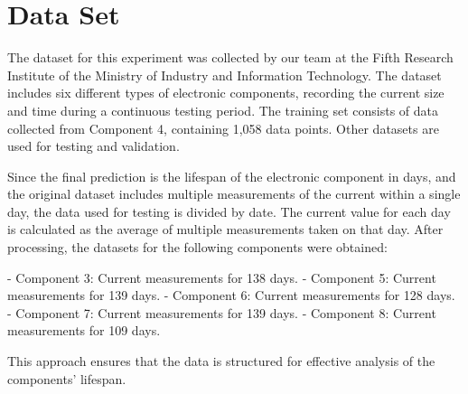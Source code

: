 \section{Data Set}
\label{sec:dataset}
The dataset for this experiment was collected by our team at the Fifth Research Institute of the Ministry of Industry and Information Technology. The dataset includes six different types of electronic components, recording the current size and time during a continuous testing period. The training set consists of data collected from Component 4, containing 1,058 data points. Other datasets are used for testing and validation. 

Since the final prediction is the lifespan of the electronic component in days, and the original dataset includes multiple measurements of the current within a single day, the data used for testing is divided by date. The current value for each day is calculated as the average of multiple measurements taken on that day. After processing, the datasets for the following components were obtained:

- Component 3: Current measurements for 138 days.
- Component 5: Current measurements for 139 days.
- Component 6: Current measurements for 128 days.
- Component 7: Current measurements for 139 days.
- Component 8: Current measurements for 109 days.

This approach ensures that the data is structured for effective analysis of the components' lifespan.
